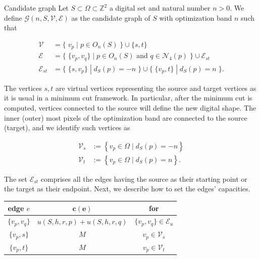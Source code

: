 \documentclass[smallextended]{svjour3}
\begin{document}
\begin{definition}{Candidate graph}
Let $S \subset \Omega \subset \mathbb{Z}^2$ a digital set and natural number $n>0$. We define $\mathcal{G}(n,S,\mathcal{V},\mathcal{E})$ as the candidate graph of $S$ with optimization band $n$ such that

\begin{align*}
\mathcal{V} &= \big\{\; v_p \; | \; p \in O_n(S) \;\} \cup \{s,t \big\} \\
\mathcal{E} &= \big\{ \; \{v_p,v_q\} \; | \; p \in O_n(S) \text{ and } q \in \mathcal{N}_4(p) \; \big\} \cup \mathcal{E}_{st}\\
\mathcal{E}_{st} &= \big\{\; \{s,v_p\} \; | \; d_S(p)=-n \; \big\} \cup \big\{\; \{v_p,t\} \; | \; d_S(p)=n \; \big\}.
\end{align*}

\end{definition}

The vertices $s,t$ are virtual vertices representing the source and target vertices as it is usual in a minimum cut framework. In particular, after the minimum cut is computed, vertices connected to the source will define the new digital shape. The inner (outer) most pixels of the optimization band are connected to the source (target), and we identify such vertices as

\begin{align*}
	\mathcal{V}_s &:=\left\{ v_p \in \Omega \; | \; d_{S}(p) = -n \right\} \\
	\mathcal{V}_t &:=\left\{ v_p \in \Omega \; | \; d_{S}(p) = n \right\}.
\end{align*}

The set $\mathcal{E}_{st}$ comprises all the edges having the source as their starting point or the target as their endpoint. Next, we describe how to set the edges' capacities.

\begin{center}
\begin{tabular}{|c|c|c|}
\hline
\textbf{edge} $e$ & $\mathbf{c(e)}$ & \textbf{for}\\
\hline
$\{v_p, v_q\}$ & $ u(S,h,r,p) + u(S,h,r,q) $ & $\{v_p,v_q\} \in \mathcal{E}_{u}$\\
\hline
$\{v_p, s\}$ & $M$ & $v_p \in \mathcal{V}_{s}$ \\
\hline
$\{v_p, t\}$ & $M$ & $v_p \in \mathcal{V}_{t}$ \\
\hline
\end{tabular}
\end{center}
\end{document}
